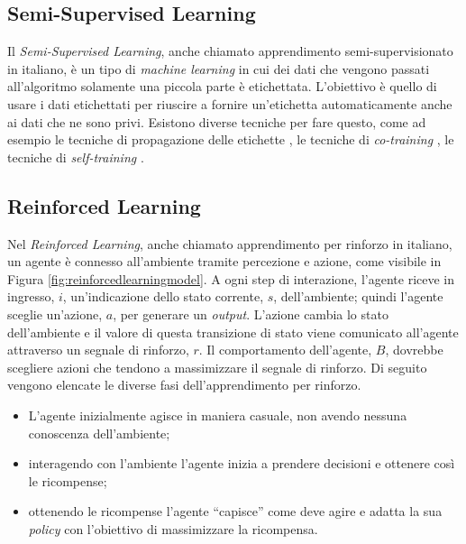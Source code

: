 \documentclass[12pt,italian]{report}
\begin{document}
	
	\subsection{Semi-Supervised Learning}
	Il \textit{Semi-Supervised Learning}, anche chiamato apprendimento semi-supervisionato in italiano, è un tipo di \textit{machine learning} in cui dei dati che vengono passati all'algoritmo solamente una piccola parte è etichettata. L'obiettivo è quello di usare i dati etichettati per riuscire a fornire un'etichetta automaticamente anche ai dati che ne sono privi. Esistono diverse tecniche per fare questo, come ad esempio le tecniche di propagazione delle etichette \cite{LearningfromLabeledandUnlabeledDatawithLabelPropagation}, le tecniche di \textit{co-training} \cite{10.1145/279943.279962}, le tecniche di \textit{self-training} \cite{inproceedings}.
	
	
	\subsection{Reinforced Learning}
	\label{reinforcedLearning}
	Nel \textit{Reinforced Learning}, anche chiamato apprendimento per rinforzo in italiano, un agente è connesso all'ambiente tramite percezione e azione, come visibile in Figura \ref{fig:reinforcedlearningmodel}. A ogni step di interazione, l'agente riceve in ingresso, $i$, un'indicazione dello stato corrente, $s$, dell'ambiente; quindi l'agente sceglie un'azione, $a$, per generare un \textit{output}. L'azione cambia lo stato dell'ambiente e il valore di questa transizione di stato viene comunicato all'agente attraverso un segnale di rinforzo, $r$. Il comportamento dell'agente, $B$, dovrebbe scegliere azioni che tendono a massimizzare il segnale di rinforzo. Di seguito vengono elencate le diverse fasi dell'apprendimento per rinforzo.
	\begin{itemize}
		\item L'agente inizialmente agisce in maniera casuale, non avendo nessuna conoscenza dell'ambiente;
		\item interagendo con l'ambiente l'agente inizia a prendere decisioni e ottenere così le ricompense;
		\item ottenendo le ricompense l'agente ``capisce'' come deve agire e adatta la sua \textit{policy} con l'obiettivo di massimizzare la ricompensa.
	\end{itemize}
	
\end{document}
